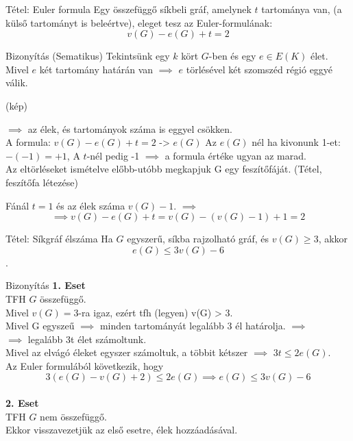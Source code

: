 \documentclass{beamer}
\begin{document}
\begin{frame}

\begin{block}{Tétel: Euler formula}
Egy összefüggő síkbeli gráf, amelynek $t$ tartománya van, (a külső tartományt is beleértve), eleget tesz az Euler-formulának:
$$v(G) - e(G) + t = 2$$

\end{block}

\begin{block}{Bizonyítás (Sematikus)}
Tekintsünk egy $k$ kört $G$-ben és egy $e \in E(K)$ élet.\\
Mivel $e$ két tartomány határán van $\implies$ $e$ törlésével két szomszéd régió eggyé válik.

(kép)

$\implies$ az élek, és tartományok száma is eggyel csökken.\\
A formula: $v(G) - e(G) + t = 2$ -> $e(G)$ Az $e(G)$ nél ha kivonunk 1-et: $-(-1) = +1$, A $t$-nél pedig -1 $\implies$ a formula értéke ugyan az marad.\\

Az eltörléseket ismételve előbb-utóbb megkapjuk G egy feszítőfáját. (Tétel, feszítőfa létezése)

Fánál $t = 1$ és az élek száma $v(G) - 1$. $\implies$
$$\implies v(G) - e(G) + t = v(G) - (v(G) - 1) + 1 = 2$$

\end{block}
\end{frame}

\begin{frame}
\begin{block}{Tétel: Síkgráf élszáma}
 Ha $G$ egyszerű, síkba rajzolható gráf, és $v(G) \geq 3$, akkor $$e(G) \leq 3v(G) - 6$$.

\end{block}

\begin{block}{Bizonyítás}
\textbf{1. Eset}\\
TFH $G$ összefüggő.\\
Mivel $v(G) = 3$-ra igaz, ezért tfh (legyen) v(G) > 3.\\
Mivel G egyszeű $\implies$ minden tartományát legalább 3 él határolja. $\implies$\\
$\implies$ legalább 3t élet számoltunk.\\
Mivel az elvágó éleket egyszer számoltuk, a többit kétszer $\implies$ $3t \leq 2e(G)$.\\
Az Euler formulából következik, hogy $$3(e(G) - v(G) + 2) \leq 2e(G) \implies e(G) \leq 3v(G) - 6$$\\
\smallskip
\textbf{2. Eset}\\
TFH $G$ nem összefüggő.\\
Ekkor visszavezetjük az első esetre, élek hozzáadásával.

\end{block}

\end{frame}
\end{document}
